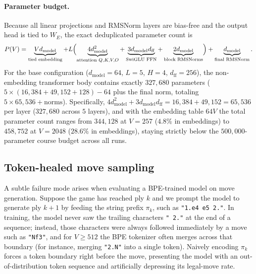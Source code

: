 \documentclass[11pt]{article}
\begin{document}
\paragraph{Parameter budget.} Because all linear projections and RMSNorm layers are bias-free and the output head is tied to $W_E$, the exact deduplicated parameter count is
\begin{equation}
P(V) = \underbrace{V d_{\mathrm{model}}}_{\text{tied embedding}} + L\Bigl(\underbrace{4 d_{\mathrm{model}}^2}_{\text{attention } Q,K,V,O} + \underbrace{3 d_{\mathrm{model}} d_{\mathrm{ff}}}_{\text{SwiGLU FFN}} + \underbrace{2 d_{\mathrm{model}}}_{\text{block RMSNorms}}\Bigr) + \underbrace{d_{\mathrm{model}}}_{\text{final RMSNorm}}.
\label{eq:params}
\end{equation}
For the base configuration ($d_{\mathrm{model}}=64$, $L=5$, $H=4$, $d_{\mathrm{ff}}=256$), the non-embedding transformer body contains exactly $327{,}680$ parameters ($5 \times (16{,}384 + 49{,}152 + 128) - 64$ plus the final norm, totaling $5 \times 65{,}536 + \text{norms}$). Specifically, $4d_{\mathrm{model}}^2 + 3d_{\mathrm{model}}d_{\mathrm{ff}} = 16{,}384 + 49{,}152 = 65{,}536$ per layer ($327{,}680$ across $5$ layers), and with the embedding table $64V$ the total parameter count ranges from $344{,}128$ at $V=257$ ($4.8\%$ in embeddings) to $458{,}752$ at $V=2048$ ($28.6\%$ in embeddings), staying strictly below the $500{,}000$-parameter course budget across all runs.

\subsection{Token-healed move sampling}
\label{sec:healing}

A subtle failure mode arises when evaluating a BPE-trained model on move generation. Suppose the game has reached ply $k$ and we prompt the model to generate ply $k+1$ by feeding the string prefix $\pi_k$, such as \texttt{"1.e4 e5 2."}. In training, the model never saw the trailing characters \texttt{" 2."} at the end of a sequence; instead, those characters were always followed immediately by a move such as \texttt{"Nf3"}, and for $V \ge 512$ the BPE tokenizer often merges across that boundary (for instance, merging \texttt{"2.N"} into a single token). Naively encoding $\pi_k$ forces a token boundary right before the move, presenting the model with an out-of-distribution token sequence and artificially depressing its legal-move rate.
\end{document}
